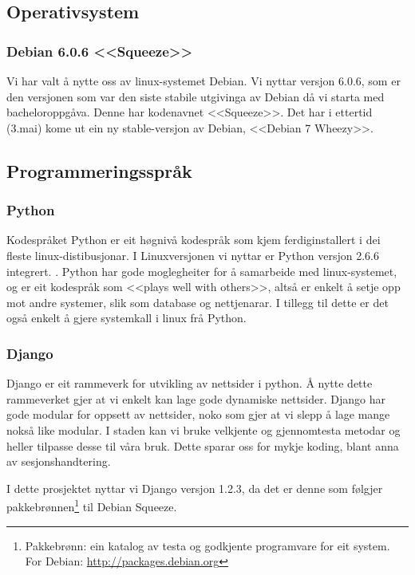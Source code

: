 \documentclass[nynorsk,12pt,a4paper,oneside]{book}
\begin{document}
\subsection{Operativsystem}
\subsubsection{Debian 6.0.6 <<Squeeze>>} 
Vi har valt å nytte oss av linux-systemet Debian. Vi nyttar versjon 6.0.6, som er den versjonen som var den siste stabile utgivinga av Debian då vi starta med bacheloroppgåva. Denne har kodenavnet <<Squeeze>>. Det har i ettertid (3.mai) kome ut ein ny stable-versjon av Debian, <<Debian 7 Wheezy>>. \cite{wheezy}

\subsection{Programmeringsspråk}
\subsubsection{Python}
Kodespråket Python er eit høgnivå kodespråk som kjem ferdiginstallert i dei fleste linux-distibusjonar. I Linuxversjonen vi nyttar er Python versjon 2.6.6 integrert. \cite{pythonversjon}. 
Python har gode moglegheiter for å samarbeide med linux-systemet, og er eit kodespråk som <<plays well with others>>, altså er enkelt å setje opp mot andre systemer, slik som database og nettjenarar. \cite{python, pythonapps} I tillegg til dette er det også enkelt å gjere systemkall i linux frå Python. \cite{pythonsubprocess}


\subsubsection{Django}
Django er eit rammeverk for utvikling av nettsider i python. Å nytte dette rammeverket gjer at vi enkelt kan lage gode dynamiske nettsider. Django har gode modular for oppsett av nettsider, noko som gjer at vi slepp å lage mange nokså like modular. I staden kan vi bruke velkjente og gjennomtesta metodar og heller tilpasse desse til våra bruk. Dette sparar oss for mykje koding, blant anna av sesjonshandtering.\cite{djangowww, djangosessions}

I dette prosjektet nyttar vi Django versjon 1.2.3, da det er denne som følgjer pakkebrønnen\footnote{Pakkebrønn: ein katalog av testa og godkjente programvare for eit system. \\For Debian:  \url{http://packages.debian.org} } til Debian Squeeze. \cite{djangopkg}
\end{document}
